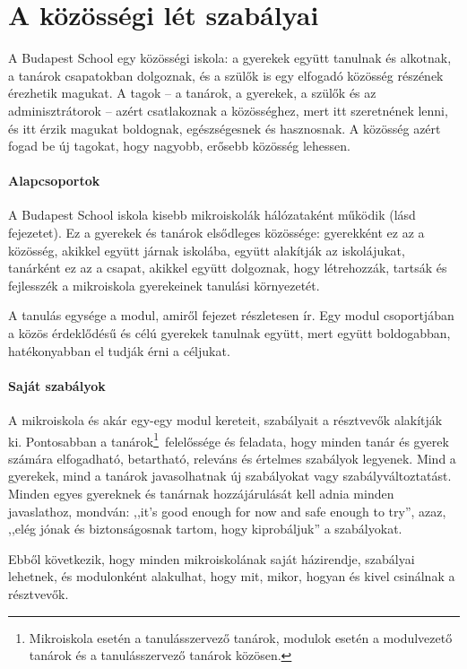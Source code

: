 \section{A közösségi lét szabályai}
\label{sec:kozossegi_elet}
A Budapest School egy közösségi iskola: a gyerekek együtt tanulnak és alkotnak, a tanárok csapatokban dolgoznak, és a szülők is egy elfogadó közösség részének érezhetik magukat. A tagok -- a tanárok, a gyerekek, a szülők és az adminisztrátorok -- azért csatlakoznak a közösséghez, mert itt szeretnének lenni, és itt érzik magukat boldognak, egészségesnek és hasznosnak. A közösség azért fogad be új tagokat, hogy nagyobb, erősebb közösség lehessen.

\paragraph{Alapcsoportok} A Budapest School iskola kisebb mikroiskolák
hálózataként működik (lásd  fejezetet). Ez a gyerekek és tanárok elsődleges közössége: gyerekként ez az a közösség, akikkel együtt járnak iskolába, együtt alakítják az iskolájukat, tanárként ez az a csapat, akikkel együtt dolgoznak, hogy létrehozzák, tartsák és fejlesszék a mikroiskola gyerekeinek tanulási környezetét.

A tanulás egysége a modul, amiről  fejezet részletesen ír. Egy modul csoportjában a közös érdeklődésű és célú gyerekek tanulnak együtt, mert együtt boldogabban, hatékonyabban el tudják érni a céljukat.

\paragraph{Saját szabályok}
\label{sec:sajat_szabalyok}
A mikroiskola és akár egy-egy modul kereteit, szabályait a résztvevők alakítják ki. Pontosabban a tanárok\footnote{Mikroiskola esetén a tanulásszervező tanárok, modulok esetén a modulvezető tanárok és a tanulásszervező tanárok közösen.}~felelőssége és feladata, hogy minden tanár és gyerek számára elfogadható, betartható, releváns és értelmes szabályok legyenek. Mind a gyerekek, mind a tanárok javasolhatnak új szabályokat vagy szabályváltoztatást. Minden egyes gyereknek és tanárnak hozzájárulását kell adnia minden javaslathoz, mondván: ,,it's good enough for now and safe enough to try'', azaz, ,,elég jónak és biztonságosnak tartom, hogy kiprobáljuk'' a szabályokat.

Ebből következik, hogy minden mikroiskolának saját házirendje, szabályai lehetnek, és modulonként alakulhat, hogy mit, mikor, hogyan és kivel csinálnak a résztvevők.

